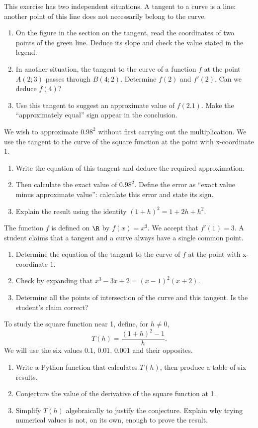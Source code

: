 This exercise has two independent situations. A tangent to a curve is a line: another point of this line does not necessarily belong to the curve.
\begin{enumerate}[label=\arabic*.]
\item On the figure in the section on the tangent, read the coordinates of two points of the green line. Deduce its slope and check the value stated in the legend.
\item In another situation, the tangent to the curve of a function $f$ at the point $A(2;3)$ passes through $B(4;2)$. Determine $f(2)$ and $f\prime(2)$. Can we deduce $f(4)$?
\item Use this tangent to suggest an approximate value of $f(2.1)$. Make the ``approximately equal'' sign appear in the conclusion.
\end{enumerate}
We wish to approximate $0.98^2$ without first carrying out the multiplication. We use the tangent to the curve of the square function at the point with x-coordinate 1.
\begin{enumerate}[label=\arabic*.]
\item Write the equation of this tangent and deduce the required approximation.
\item Then calculate the exact value of $0.98^2$. Define the error as ``exact value minus approximate value'': calculate this error and state its sign.
\item Explain the result using the identity $(1+h)^2=1+2h+h^2$.
\end{enumerate}
The function $f$ is defined on $\R$ by $f(x)=x^3$. We accept that $f\prime(1)=3$. A student claims that a tangent and a curve always have a single common point.
\begin{enumerate}[label=\arabic*.]
\item Determine the equation of the tangent to the curve of $f$ at the point with x-coordinate 1.
\item Check by expanding that $x^3-3x+2=(x-1)^2(x+2)$.
\item Determine all the points of intersection of the curve and this tangent. Is the student's claim correct?
\end{enumerate}
To study the square function near 1, define, for $h\ne0$,\[T(h)=\dfrac{(1+h)^2-1}{h}.\]We will use the six values $0.1$, $0.01$, $0.001$ and their opposites.
\begin{enumerate}[label=\arabic*.]
\item Write a Python function that calculates $T(h)$, then produce a table of six results.
\item Conjecture the value of the derivative of the square function at 1.
\item Simplify $T(h)$ algebraically to justify the conjecture. Explain why trying numerical values is not, on its own, enough to prove the result.
\end{enumerate}
